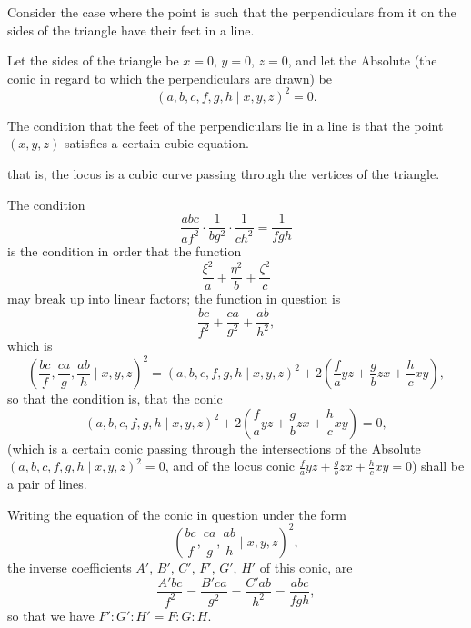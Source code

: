\documentclass[11pt,a4paper]{article}
\theoremstyle{plain}
\begin{document}
\newpage
\setcounter{equation}{1}

Consider the case where the point is such that the perpendiculars from it on the sides of the triangle have their feet in a line.

Let the sides of the triangle be $x = 0$, $y = 0$, $z = 0$, and let the Absolute (the conic in regard to which the perpendiculars are drawn) be
\begin{equation}
(a, b, c, f, g, h \mid x, y, z)^2 = 0.
\end{equation}

The condition that the feet of the perpendiculars lie in a line is that the point $(x, y, z)$ satisfies a certain cubic equation.

\newpage
\setcounter{equation}{2}

that is, the locus is a cubic curve passing through the vertices of the triangle.

The condition
\begin{equation}
\frac{abc}{af^2} \cdot \frac{1}{bg^2} \cdot \frac{1}{ch^2} = \frac{1}{fgh}
\end{equation}
is the condition in order that the function
\begin{equation}
\frac{\xi^2}{a} + \frac{\eta^2}{b} + \frac{\zeta^2}{c}
\end{equation}
may break up into linear factors; the function in question is
\begin{equation}
\frac{bc}{f^2} + \frac{ca}{g^2} + \frac{ab}{h^2},
\end{equation}
which is
\begin{equation}
\left(\frac{bc}{f}, \frac{ca}{g}, \frac{ab}{h} \mid x, y, z\right)^2 = (a, b, c, f, g, h \mid x, y, z)^2 + 2\left(\frac{f}{a}yz + \frac{g}{b}zx + \frac{h}{c}xy\right),
\end{equation}
so that the condition is, that the conic
\begin{equation}
(a, b, c, f, g, h \mid x, y, z)^2 + 2\left(\frac{f}{a}yz + \frac{g}{b}zx + \frac{h}{c}xy\right) = 0,
\end{equation}
(which is a certain conic passing through the intersections of the Absolute $(a, b, c, f, g, h \mid x, y, z)^2 = 0$, and of the locus conic $\frac{f}{a}yz + \frac{g}{b}zx + \frac{h}{c}xy = 0$) shall be a pair of lines.

\newpage
\setcounter{equation}{7}

Writing the equation of the conic in question under the form
\begin{equation}
\left(\frac{bc}{f}, \frac{ca}{g}, \frac{ab}{h} \mid x, y, z\right)^2,
\end{equation}
the inverse coefficients $A'$, $B'$, $C'$, $F'$, $G'$, $H'$ of this conic, are
\begin{equation}
\frac{A'bc}{f^2} = \frac{B'ca}{g^2} = \frac{C'ab}{h^2} = \frac{abc}{fgh},
\end{equation}
so that we have $F' : G' : H' = F : G : H$.
\end{document}
